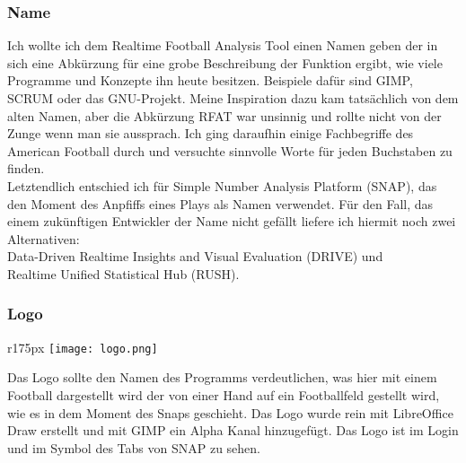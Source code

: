 \subsubsection{Name}
Ich wollte ich dem Realtime Football Analysis Tool einen Namen geben der in sich eine Abkürzung für eine grobe Beschreibung der Funktion ergibt, wie viele Programme und Konzepte ihn heute besitzen. Beispiele dafür sind GIMP, SCRUM oder das GNU-Projekt. Meine Inspiration dazu kam tatsächlich von dem alten Namen, aber die Abkürzung RFAT war unsinnig und rollte nicht von der Zunge wenn man sie aussprach. Ich ging daraufhin einige Fachbegriffe des American Football durch und versuchte sinnvolle Worte für jeden Buchstaben zu finden. \\
Letztendlich entschied ich für Simple Number Analysis Platform (SNAP), das den Moment des Anpfiffs eines Plays als Namen verwendet. Für den Fall, das einem zukünftigen Entwickler der Name nicht gefällt liefere ich hiermit noch zwei Alternativen: \\
Data-Driven Realtime Insights and Visual Evaluation (DRIVE) und \\
Realtime Unified Statistical Hub (RUSH).

\subsubsection{Logo}

\begin{wrapfigure}{r}{175px}
	\vspace{-10pt}
	\hspace{15pt}
	\texttt{[image: logo.png]}
\end{wrapfigure}

Das Logo sollte den Namen des Programms verdeutlichen, was hier mit einem Football dargestellt wird der von einer Hand auf ein Footballfeld gestellt wird, wie es in dem Moment des Snaps geschieht.
Das Logo wurde rein mit LibreOffice Draw erstellt und mit GIMP ein Alpha Kanal hinzugefügt. Das Logo ist im Login und im Symbol des Tabs von SNAP zu sehen. 